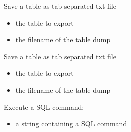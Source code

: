 \documentclass[letterpaper,10pt,english]{sphinxmanual}
\begin{document}
\begin{fulllineitems}
\begin{fulllineitems}
\end{fulllineitems}


\begin{fulllineitems}
\label{\detokenize{modules_doc:cbmpy.CBNetDB.DBTools.dumpTableToCSV}}
\pysigstartsignatures
{}
\pysigstopsignatures
\sphinxAtStartPar
Save a table as tab separated txt file
\begin{itemize}
\item {} 
\sphinxAtStartPar
{} the table to export

\item {} 
\sphinxAtStartPar
{} the filename of the table dump

\end{itemize}

\end{fulllineitems}


\begin{fulllineitems}
\label{\detokenize{modules_doc:cbmpy.CBNetDB.DBTools.dumpTableToTxt}}
\pysigstartsignatures
{}
\pysigstopsignatures
\sphinxAtStartPar
Save a table as tab separated txt file
\begin{itemize}
\item {} 
\sphinxAtStartPar
{} the table to export

\item {} 
\sphinxAtStartPar
{} the filename of the table dump

\end{itemize}

\end{fulllineitems}


\begin{fulllineitems}
\label{\detokenize{modules_doc:cbmpy.CBNetDB.DBTools.executeSQL}}
\pysigstartsignatures
{}
\pysigstopsignatures
\sphinxAtStartPar
Execute a SQL command:
\begin{itemize}
\item {} 
\sphinxAtStartPar
{} a string containing a SQL command


\end{itemize}
\end{fulllineitems}
\end{fulllineitems}
\end{document}

